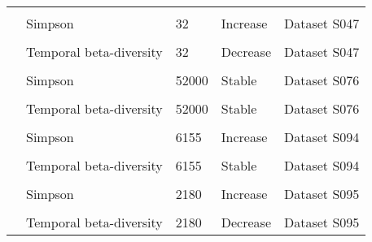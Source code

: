 \documentclass[
  12pt,
  oneside]{report}
\begin{document}
\begin{landscape}
\begin{longtable}[t]{llll>{\raggedright\arraybackslash}p{30em}}
\cellcolor{gray!6}{\cite{pilotto_meta-analysis_2020}} & \cellcolor{gray!6}{SR} & \cellcolor{gray!6}{32} & \cellcolor{gray!6}{Increase} & \cellcolor{gray!6}{Dataset S047}\\
\cite{pilotto_meta-analysis_2020} & Simpson & 32 & Increase & Dataset S047\\
\cellcolor{gray!6}{\cite{pilotto_meta-analysis_2020}} & \cellcolor{gray!6}{Abundance} & \cellcolor{gray!6}{32} & \cellcolor{gray!6}{Increase} & \cellcolor{gray!6}{Dataset S047}\\
\addlinespace
\cite{pilotto_meta-analysis_2020} & Temporal beta-diversity & 32 & Decrease & Dataset S047\\
\cellcolor{gray!6}{\cite{pilotto_meta-analysis_2020}} & \cellcolor{gray!6}{SR} & \cellcolor{gray!6}{52000} & \cellcolor{gray!6}{Stable} & \cellcolor{gray!6}{Dataset S076}\\
\cite{pilotto_meta-analysis_2020} & Simpson & 52000 & Stable & Dataset S076\\
\cellcolor{gray!6}{\cite{pilotto_meta-analysis_2020}} & \cellcolor{gray!6}{Abundance} & \cellcolor{gray!6}{52000} & \cellcolor{gray!6}{Stable} & \cellcolor{gray!6}{Dataset S076}\\
\cite{pilotto_meta-analysis_2020} & Temporal beta-diversity & 52000 & Stable & Dataset S076\\
\addlinespace
\cellcolor{gray!6}{\cite{pilotto_meta-analysis_2020}} & \cellcolor{gray!6}{SR} & \cellcolor{gray!6}{6155} & \cellcolor{gray!6}{Increase} & \cellcolor{gray!6}{Dataset S094}\\
\cite{pilotto_meta-analysis_2020} & Simpson & 6155 & Increase & Dataset S094\\
\cellcolor{gray!6}{\cite{pilotto_meta-analysis_2020}} & \cellcolor{gray!6}{Abundance} & \cellcolor{gray!6}{6155} & \cellcolor{gray!6}{Increase} & \cellcolor{gray!6}{Dataset S094}\\
\cite{pilotto_meta-analysis_2020} & Temporal beta-diversity & 6155 & Stable & Dataset S094\\
\cellcolor{gray!6}{\cite{pilotto_meta-analysis_2020}} & \cellcolor{gray!6}{SR} & \cellcolor{gray!6}{2180} & \cellcolor{gray!6}{Decrease} & \cellcolor{gray!6}{Dataset S095}\\
\addlinespace
\cite{pilotto_meta-analysis_2020} & Simpson & 2180 & Increase & Dataset S095\\
\cellcolor{gray!6}{\cite{pilotto_meta-analysis_2020}} & \cellcolor{gray!6}{Abundance} & \cellcolor{gray!6}{2180} & \cellcolor{gray!6}{Stable} & \cellcolor{gray!6}{Dataset S095, p-val = 0.056}\\
\cite{pilotto_meta-analysis_2020} & Temporal beta-diversity & 2180 & Decrease & Dataset S095\\*
\end{longtable}
\endgroup{}
\end{landscape}

\singlespacing


\renewcommand\bibname{References}
  
\end{document}

